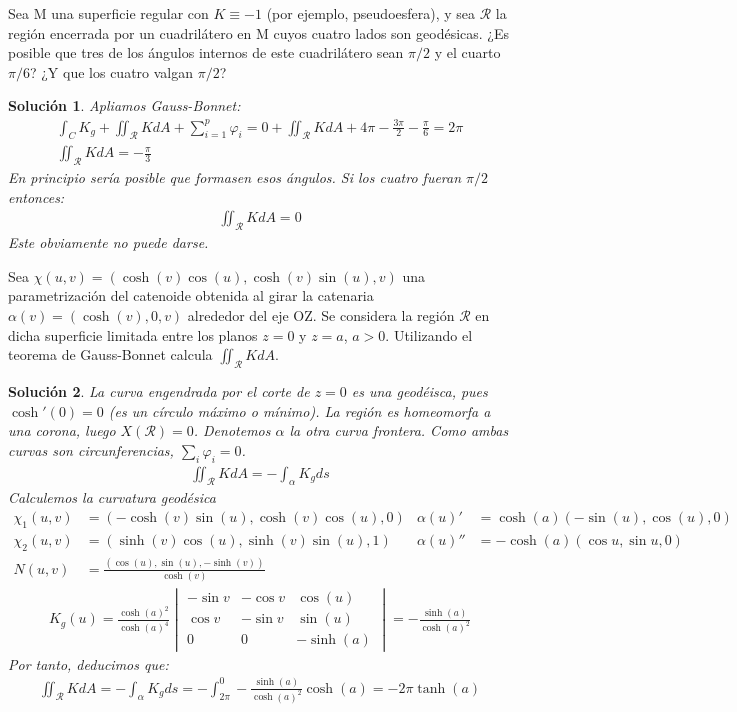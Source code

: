 \documentclass[twoside]{report}
\theoremstyle{plain}
\newtheorem*{sol*}{Solución}
\newcommand{\X}{\chi}
\newenvironment{ejercicio}[2][Estado]{\begin{trivlist}
\item[\hskip \labelsep {\bfseries Ejercicio}\hskip \labelsep {\bfseries #2.}]}{\end{trivlist}}
\begin{document}
\newpage
\begin{ejercicio}{15} Sea M una superficie regular con $K\equiv -1$ (por ejemplo, pseudoesfera), y sea $\mathcal{R}$ la región encerrada por un cuadrilátero en M cuyos cuatro lados son geodésicas. ¿Es posible que tres de los ángulos internos de este cuadrilátero sean $\pi/2$ y el cuarto $\pi/6$? ¿Y que los cuatro valgan $\pi/2$?
\end{ejercicio}
\begin{sol*}
Apliamos Gauss-Bonnet:
\begin{gather*}
\int_{C}K_g + \iint_\mathcal{R} KdA + \sum_{i=1}^p \varphi_i = 0+ \iint_\mathcal{R} KdA + 4\pi - \frac{3\pi}{2} -\frac{\pi}{6} = 2\pi\\
\iint_\mathcal{R} KdA = -\frac{\pi}{3}
\end{gather*}
En principio sería posible que formasen esos ángulos. Si los cuatro fueran $\pi/2$ entonces:
\begin{gather*}
\iint_\mathcal{R} KdA = 0
\end{gather*}
Este obviamente no puede darse.
\end{sol*}
\newpage
\begin{ejercicio}{17} Sea $\X(u,v)=(\cosh(v)\cos(u),\cosh(v)\sin(u),v)$ una parametrización del catenoide obtenida al girar la catenaria $\alpha(v)=(\cosh(v),0,v)$ alrededor del eje OZ. Se considera la región $\mathcal{R}$ en dicha superficie limitada entre los planos $z=0$ y $z=a$, $a>0$. Utilizando el teorema de Gauss-Bonnet calcula $\iint_\mathcal{R} KdA$.
\end{ejercicio}
\begin{sol*} La curva engendrada por el corte de $z=0$ es una geodéisca, pues $\cosh'(0)=0$ (es un círculo máximo o mínimo). La región es homeomorfa a una corona, luego $X(\mathcal{R})=0$. Denotemos $\alpha$ la otra curva frontera. Como ambas curvas son circunferencias, $\sum_i \varphi_i =0$.
\begin{gather*}
\iint_\mathcal{R} KdA =-\int_{\alpha}K_g ds
\end{gather*}
Calculemos la curvatura geodésica
\begin{align*}
\X_1(u,v) &=  (-\cosh(v)\sin(u),\cosh(v)\cos(u),0) &\alpha(u)' &=\cosh(a)(-\sin(u),\cos(u),0)\\
\X_2 (u,v)&=  (\sinh(v)\cos(u),\sinh(v)\sin(u),1) & \alpha(u)'' &=-\cosh(a)(\cos{u},\sin{u},0)\\
N(u,v)& = \frac{(\cos(u),\sin(u),-\sinh(v))}{\cosh(v)}& &
\end{align*}
\begin{gather*}
K_g(u)=\frac{\cosh(a)^2}{\cosh(a)^4}
\begin{vmatrix}
-\sin v & -\cos v & \cos(u)\\
 \cos v & -\sin v & \sin(u)\\
 0 		& 0		 & -\sinh(a)
\end{vmatrix}
=
-\frac{\sinh(a)}{\cosh(a)^2}
\end{gather*}
Por tanto, deducimos que:
\begin{gather*}
\iint_\mathcal{R} KdA = -\int_{\alpha}K_g ds = - \int_{2\pi}^0 -\frac{\sinh(a)}{\cosh(a)^2}\cosh(a) = -2\pi\tanh(a)
\end{gather*}
\end{sol*}
\end{document}
